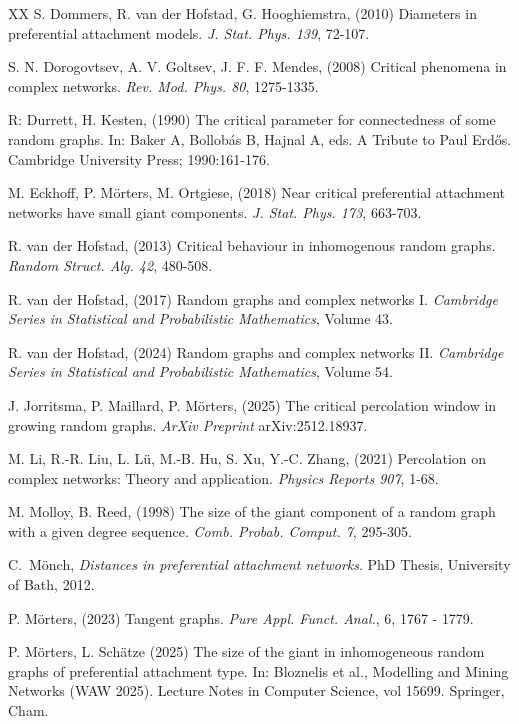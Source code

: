 \documentclass[12pt,a4paper]{article}
\numberwithin{equation}{section}
\begin{document}
{\begin{thebibliography}{XX}
 S. Dommers, R. van der Hofstad, G. Hooghiemstra, (2010) Diameters in preferential attachment models.
         \textit{J. Stat. Phys. 139}, 72-107.

S. N. Dorogovtsev, A. V. Goltsev, J. F. F. Mendes, (2008)
Critical phenomena in complex networks.
\textit{Rev. Mod. Phys. 80}, 1275-1335.

 R: Durrett, H. Kesten,
(1990) The critical parameter for connectedness of some random graphs. In: Baker A, Bollobás B, Hajnal A, eds. A Tribute to Paul Erd\H{o}s. Cambridge University Press; 1990:161-176.


           M. Eckhoff, P. Mörters, M. Ortgiese, (2018) Near critical preferential attachment networks have small giant components. 
         \textit{J. Stat. Phys. 173}, 663-703.

          R. van der Hofstad, (2013) Critical behaviour in inhomogenous random graphs.
         \textit{Random Struct.  Alg. 42}, 480-508.

 R. van der Hofstad, (2017) Random graphs and complex networks I.
         \textit{Cambridge Series in Statistical and Probabilistic Mathematics}, Volume 43.
         
          R. van der Hofstad, (2024) Random graphs and complex networks II.
         \textit{Cambridge Series in Statistical and Probabilistic Mathematics}, Volume 54.

 J. Jorritsma, P. Maillard, P. Mörters, (2025) 
The critical percolation window in growing random graphs. \emph{ArXiv Preprint}	arXiv:2512.18937.

M. Li, R.-R. Liu, L. L\"u, M.-B. Hu, S. Xu, Y.-C. Zhang, (2021)
Percolation on complex networks: Theory and application.
\textit{Physics Reports 907}, 1-68.

M. Molloy, B. Reed, (1998) 
The size of the giant component of a random graph with a given degree sequence.
\textit{Comb. Probab. Comput. 7},  295-305.

 C.\ Mönch, \textit{Distances in preferential attachment networks}. PhD Thesis, University of Bath, 2012.

 P. Mörters, (2023) Tangent graphs. 
\textit{Pure Appl. Funct. Anal.}, 6, 1767 - 1779.

 P. Mörters, L. Schätze (2025) The size of the giant in inhomogeneous random graphs of preferential attachment type. In: Bloznelis et al., Modelling and Mining Networks (WAW 2025). Lecture Notes in Computer Science, vol 15699. Springer, Cham. 


\end{thebibliography}}
\end{document}
